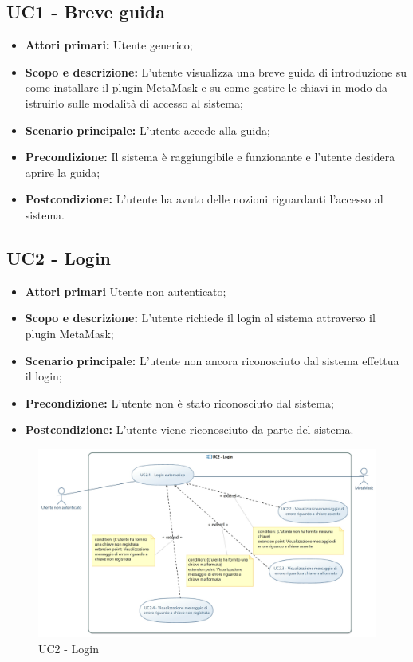 \documentclass[AnalisiDeiRequisiti.tex]{subfiles}
\begin{document}
\subsection{UC1 - Breve guida}
\begin{itemize}
	\item \textbf{Attori primari:} Utente generico;\\
	\item \textbf{Scopo e descrizione:} L'utente visualizza una breve guida di introduzione su come installare il plugin MetaMask e su come gestire le chiavi in modo da istruirlo sulle modalità di accesso al sistema;\\
	\item \textbf{Scenario principale:} L'utente accede alla guida;\\
	\item \textbf{Precondizione:} Il sistema è raggiungibile e funzionante e l'utente desidera aprire la guida;\\
	\item \textbf{Postcondizione:} L'utente ha avuto delle nozioni riguardanti l'accesso al sistema.\\
\end{itemize}
\subsection{UC2 - Login}
\begin{itemize}
	\item \textbf{Attori primari} Utente non autenticato;\\
	\item \textbf{Scopo e descrizione:} L'utente richiede il login al sistema attraverso il plugin MetaMask;\\
	\item \textbf{Scenario principale:} L'utente non ancora riconosciuto dal sistema effettua il login;\\
	\item \textbf{Precondizione:} L'utente non è stato riconosciuto dal sistema;\\
	\item \textbf{Postcondizione:} L'utente viene riconosciuto da parte del sistema.\\
\end{itemize}

\begin{figure}[H]
	\centering
	\includegraphics[width=1.0\linewidth]{UC2.jpg}
	\caption{UC2 - Login}
	\label{fig:UC2 - Login}
\end{figure}
\end{document}
